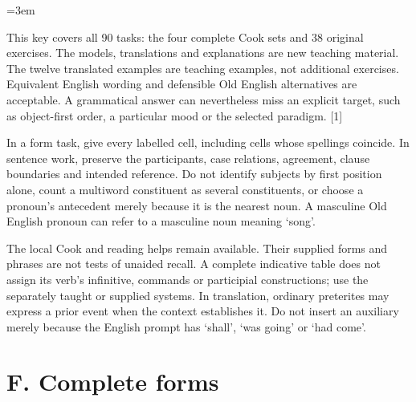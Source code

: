 \BookRecto
\begingroup
\renewcommand{\runningtitle}{Unit 13. Answer key}
\emergencystretch=3em
\newcommand{\itempara}[2]{\par\addvspace{3pt}\noindent\hangindent=1.8em\hangafter=1\makebox[1.8em][l]{#1.}#2\par}
\newcommand{\reserve}[1]{\par\penalty-100\begingroup\dimen0=\pagegoal\advance\dimen0 by-\pagetotal\ifdim\dimen0<#1\newpage\fi\endgroup}

\raggedright
{}

This key covers all 90 tasks: the four complete Cook sets and 38 original exercises. The models, translations and explanations are new teaching material. The twelve translated examples are teaching examples, not additional exercises. Equivalent English wording and defensible Old English alternatives are acceptable. A grammatical answer can nevertheless miss an explicit target, such as object-first order, a particular mood or the selected paradigm. [1]

In a form task, give every labelled cell, including cells whose spellings coincide. In sentence work, preserve the participants, case relations, agreement, clause boundaries and intended reference. Do not identify subjects by first position alone, count a multiword constituent as several constituents, or choose a pronoun’s antecedent merely because it is the nearest noun. A masculine Old English pronoun can refer to a masculine noun meaning ‘song’.

The local Cook and reading helps remain available. Their supplied forms and phrases are not tests of unaided recall. A complete indicative table does not assign its verb’s infinitive, commands or participial constructions; use the separately taught or supplied systems. In translation, ordinary preterites may express a prior event when the context establishes it. Do not insert an auxiliary merely because the English prompt has ‘shall’, ‘was going’ or ‘had come’.

\clearpage
\section*{F. Complete forms}

